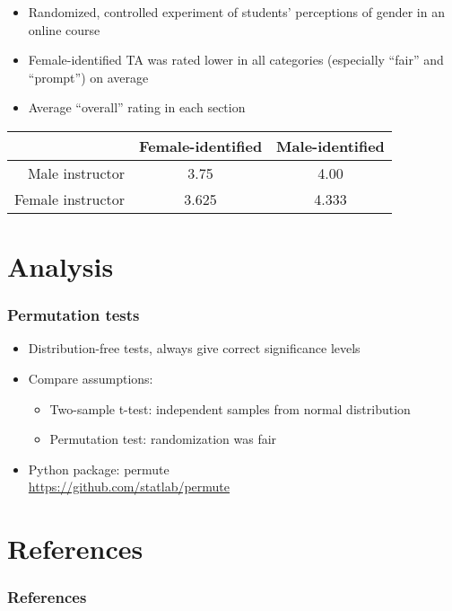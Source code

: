 \documentclass{beamer}
\begin{document}
\frame
{
  \frametitle{\cite{MacNell2014}}
\begin{itemize}
\item Randomized, controlled experiment of students' perceptions of gender in an online course
\item Female-identified TA was rated lower in all categories (especially ``fair'' and ``prompt'') on average
\item Average ``overall'' rating in each section
\end{itemize}
\begin{table}[htdp]
\begin{center}
\begin{tabular}{r|c|c|}
& Female-identified & Male-identified \\
\hline
Male instructor & 3.75 & 4.00\\
Female instructor & 3.625 & 4.333\\
\end{tabular}
\end{center}
\label{default}
\end{table}%


}

\section{Analysis}
\frame
{
 \frametitle{Permutation tests}
\Large
 \begin{itemize}
 \item Distribution-free tests, always give correct significance levels
 \item Compare assumptions:
 \begin{itemize}
 \item Two-sample t-test: independent samples from normal distribution
 \item Permutation test: randomization was fair
 \end{itemize}
 \item{Python package: permute \\
 \url{https://github.com/statlab/permute}
 }
 \end{itemize}

}

\section{References}
\begin{frame}
\frametitle{References}


\itemize
\end{frame}
\end{document}
